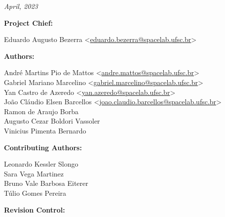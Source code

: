 %
%
%
%
%

%
%
%
%
%

\thispagestyle{empty}

\begin{center}

\textbf{\thetitle}

\textit{April, 2023}

\vspace{1cm}

\textbf{Project Chief:}

Eduardo Augusto Bezerra <\href{mailto:eduardo.bezerra@spacelab.ufsc.br}{eduardo.bezerra@spacelab.ufsc.br}>

\vspace{1cm}

\textbf{Authors:}

André Martins Pio de Mattos <\href{mailto:andre.mattos@spacelab.ufsc.br}{andre.mattos@spacelab.ufsc.br}>\\
Gabriel Mariano Marcelino <\href{mailto:gabriel.marcelino@spacelab.ufsc.br}{gabriel.marcelino@spacelab.ufsc.br}>\\
Yan Castro de Azeredo <\href{mailto:yan.azeredo@spacelab.ufsc.br}{yan.azeredo@spacelab.ufsc.br}>\\
João Cláudio Elsen Barcellos <\href{mailto:joao.claudio.barcellos@spacelab.ufsc.br}{joao.claudio.barcellos@spacelab.ufsc.br}>\\
Ramon de Araujo Borba \\
Augusto Cezar Boldori Vassoler \\ 
Vinicius Pimenta Bernardo \\

\vspace{1cm}

\textbf{Contributing Authors:}

Leonardo Kessler Slongo \\
Sara Vega Martinez \\
Bruno Vale Barbosa Eiterer \\
Túlio Gomes Pereira \\

\vspace{1cm}


\textbf{Revision Control:}

\end{center}

